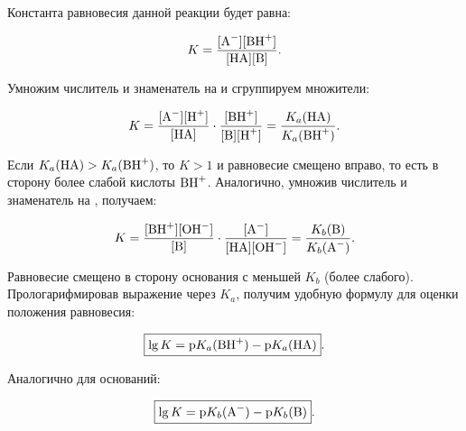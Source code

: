 Константа равновесия данной реакции будет равна:

\begin{equation*}
    K = \frac{[\ce{A^-}][\ce{BH^+}]}{[\ce{HA}][\ce{B}]}{.}
\end{equation*}

Умножим числитель и знаменатель на \ce{[H^+]} и сгруппируем множители:

\begin{equation*}
    K = \frac{[\ce{A^-}][\ce{H^+}]}{[\ce{HA}]} \cdot \frac{[\ce{BH^+}]}{[\ce{B}][\ce{H^+}]}
      = \frac{K_a(\ce{HA})}{K_a(\ce{BH^+})}{.}
\end{equation*}

Если $K_a(\ce{HA}) > K_a(\ce{BH^+})$, то $K > 1$ и равновесие смещено вправо, то есть в сторону более слабой кислоты $\ce{BH^+}$. Аналогично, умножив числитель и знаменатель на \ce{[OH^-]}, получаем:

\begin{equation*}
    K = \frac{[\ce{BH^+}][\ce{OH^-}]}{[\ce{B}]} \cdot \frac{[\ce{A^-}]}{[\ce{HA}][\ce{OH^-}]}
      = \frac{K_b(\ce{B})}{K_b(\ce{A^-})}{.}
\end{equation*}

Равновесие смещено в сторону основания с меньшей $K_b$ (более слабого). Прологарифмировав выражение через $K_a$, получим удобную формулу для оценки положения равновесия:

\begin{equation*}
    \boxed{\lg K = \text{p}K_a(\ce{BH^+}) - \text{p}K_a(\ce{HA})}.
\end{equation*}

Аналогично для оснований:

\begin{equation*}
    \boxed{\lg K = \text{p}K_b(\ce{A^-}) - \text{p}K_b(\ce{B})}.
\end{equation*}

